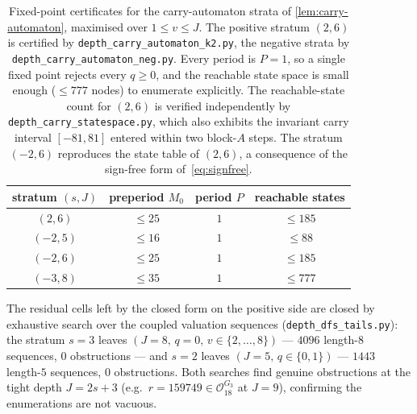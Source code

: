 \documentclass[11pt,reqno]{amsart}
\newcommand{\Obs}{\mathcal{O}}
\begin{document}
\begin{table}[ht]
\centering
\begin{tabular}{cccc}
\toprule
stratum $(s, J)$ & preperiod $M_0$ & period $P$ & reachable states \\
\midrule
$(2, 6)$  & $\le 25$ & $1$ & $\le 185$ \\
$(-2, 5)$ & $\le 16$ & $1$ & $\le 88$  \\
$(-2, 6)$ & $\le 25$ & $1$ & $\le 185$ \\
$(-3, 8)$ & $\le 35$ & $1$ & $\le 777$ \\
\bottomrule
\end{tabular}
\caption{Fixed-point certificates for the carry-automaton strata of
\cref{lem:carry-automaton}, maximised over $1 \le v \le J$. The positive stratum
$(2,6)$ is certified by \texttt{depth\_carry\_automaton\_k2.py}, the negative
strata by \texttt{depth\_carry\_automaton\_neg.py}. Every period is $P = 1$, so a
single fixed point rejects every $q \ge 0$, and the reachable state space is
small enough ($\le 777$ nodes) to enumerate explicitly. The reachable-state count
for $(2, 6)$ is verified independently by \texttt{depth\_carry\_statespace.py},
which also exhibits the invariant carry interval $[-81, 81]$ entered within two
block-$A$ steps. The stratum $(-2,6)$ reproduces the state table of $(2,6)$, a
consequence of the sign-free form of~\eqref{eq:signfree}.}
\label{tab:window-cert}
\end{table}

The residual cells left by the closed form on the positive side are closed by
exhaustive search over the coupled valuation sequences
(\texttt{depth\_dfs\_tails.py}): the stratum $s = 3$ leaves
$(J=8,\, q=0,\, v \in \{2,\dots,8\})$ --- $4096$ length-$8$ sequences, $0$
obstructions --- and $s = 2$ leaves $(J=5,\, q \in \{0,1\})$ --- $1443$
length-$5$ sequences, $0$ obstructions. Both searches find genuine obstructions
at the tight depth $J = 2s+3$ (e.g.\ $r = 159749 \in \Obs_{18}^{G_3}$ at
$J = 9$), confirming the enumerations are not vacuous.

\FloatBarrier



\end{document}
